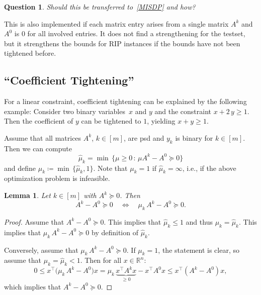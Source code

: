 \documentclass[10pt, a4paper]{article}
\newcommand{\suchthat}{\,:\,}
\newcommand{\define}{\coloneqq}
\newcommand{\T}{^{\top}}
\newcommand{\R}{\mathds{R}}
\newtheorem{lemma}[theorem]{Lemma}
\newtheorem{question}[theorem]{Question}
\begin{document}
\begin{question}
  Should this be transferred to~\eqref{MISDP} and how?
\end{question}

This is also implemented if each matrix entry arises from a single matrix
$A^k$ and $A^0$ is 0 for all involved entries. It does not find a
strengthening for the testset, but it strengthens the bounds for RIP
instances if the bounds have not been tightened before.

\subsection{``Coefficient Tightening''}
\label{sec:CoefficientTightening}

For a linear constraint, coefficient tightening can be explained by the
following example: Consider two binary variables~$x$ and $y$ and the
constraint $x + 2\, y \geq 1$. Then the coefficient of $y$ can be tightened
to $1$, yielding $x + y \geq 1$.

Assume that all matrices $A^k$, $k \in [m]$, are psd and $y_k$ is binary
for $k \in [m]$. Then we can compute
\begin{equation}\label{eq:ComputeHatMu}
  \hat{\mu}_k = \min\, \{ \mu \geq 0 \suchthat \mu A^k - A^0 \succeq 0\}
\end{equation}
and define $\mu_k \define \min\, \{\hat{\mu}_k, 1\}$. Note that $\mu_k = 1$ if
$\hat{\mu}_k = \infty$, i.e., if the above optimization problem is infeasible.

\begin{lemma}\label{lem:Tightening1}
  Let $k \in [m]$ with $A^k \succeq 0$. Then
  \[
    A^k - A^0 \succeq 0
    \quad\Leftrightarrow\quad
    \mu_k\, A^k - A^0 \succeq 0.
  \]
\end{lemma}

\begin{proof}
  Assume that $A^k - A^0 \succeq 0$. This implies that $\hat{\mu}_k \leq 1$
  and thus $\mu_k = \hat{\mu}_k$. This implies that
  $\mu_k\, A^k - A^0 \succeq 0$ by definition of $\hat{\mu}_k$.

  Conversely, assume that $\mu_k\, A^k - A^0 \succeq 0$. If $\mu_k = 1$, the
  statement is clear, so assume that $\mu_k = \hat{\mu}_k < 1$. Then for
  all $x \in \R^n$:
  \[
    0 \leq x\T \big(\mu_k\, A^k - A^0\big) x = \mu_k\,
    \underbrace{x\T A^k x}_{\geq 0} -
    x\T A^0 x \leq x\T (A^k - A^0) x,
  \]
  which implies that $A^k - A^0 \succeq 0$.
\end{proof}
\end{document}
